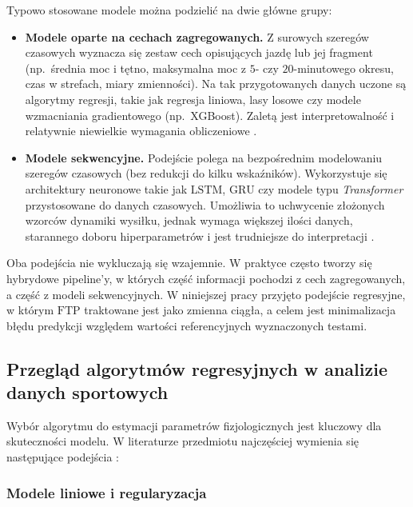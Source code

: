 Typowo stosowane modele można podzielić na dwie główne grupy:
\begin{itemize}
  \item \textbf{Modele oparte na cechach zagregowanych.} Z surowych szeregów czasowych wyznacza się zestaw cech opisujących jazdę lub jej fragment (np.\ średnia moc i tętno, maksymalna moc z $5$- czy $20$-minutowego okresu, czas w strefach, miary zmienności). Na tak przygotowanych danych uczone są algorytmy regresji, takie jak regresja liniowa, lasy losowe czy modele wzmacniania gradientowego (np.\ XGBoost). Zaletą jest interpretowalność i relatywnie niewielkie wymagania obliczeniowe \cite{stockwell2023mlftp}.
  \item \textbf{Modele sekwencyjne.} Podejście polega na bezpośrednim modelowaniu szeregów czasowych (bez redukcji do kilku wskaźników). Wykorzystuje się architektury neuronowe takie jak $\mathrm{LSTM}$, $\mathrm{GRU}$ czy modele typu \textit{Transformer} przystosowane do danych czasowych. Umożliwia to uchwycenie złożonych wzorców dynamiki wysiłku, jednak wymaga większej ilości danych, starannego doboru hiperparametrów i jest trudniejsze do interpretacji \cite{stockwell2023mlftp}.
\end{itemize}

Oba podejścia nie wykluczają się wzajemnie.
W praktyce często tworzy się hybrydowe pipeline'y, w których część informacji pochodzi z cech zagregowanych, a część z modeli sekwencyjnych.
W niniejszej pracy przyjęto podejście regresyjne, w którym $\mathrm{FTP}$ traktowane jest jako zmienna ciągła, a celem jest minimalizacja błędu predykcji względem wartości referencyjnych wyznaczonych testami.

\subsection{Przegląd algorytmów regresyjnych w analizie danych sportowych}

Wybór algorytmu do estymacji parametrów fizjologicznych jest kluczowy dla skuteczności modelu.
W literaturze przedmiotu najczęściej wymienia się następujące podejścia \cite{stockwell2023mlftp}:

\subsubsection{Modele liniowe i regularyzacja}

